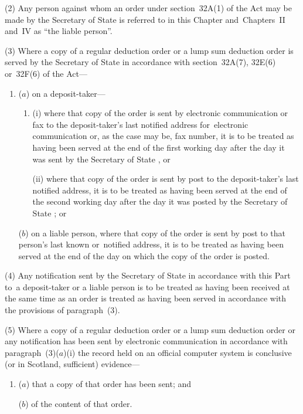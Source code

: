 \documentclass[12pt,a4paper]{article}
\begin{document}
(2) Any person against whom an order under section~32A(1) of the Act may be made by the  %
Secretary of State  %
is referred to in this Chapter and~Chapters~II and~IV as “the liable person”.

(3) Where a copy of a regular deduction order or a lump sum deduction order is served by the  
Secretary of State  %
in accordance with section~32A(7), 32E(6) or~32F(6) of the Act—
\begin{enumerate}\item[]
($a$) on a deposit-taker—
\begin{enumerate}\item[]
(i) where that copy of the order is sent by electronic communication or fax to the deposit-taker’s last notified address for~electronic communication or, as the case may be, fax number, it is to be treated as having been served at the end of the first working day after the day it was sent by the 
Secretary of State%
, or

(ii) where that copy of the order is sent by post to the deposit-taker’s last notified address, it is to be treated as having been served at the end of the second working day after the day it was posted by the 
Secretary of State%
; or
\end{enumerate}

($b$) on a liable person, where that copy of the order is sent by post to that person’s last known or~notified address, it is to be treated as having been served at the end of the day on which the copy of the order is posted.
\end{enumerate}

(4) Any notification sent by the 
Secretary of State  %
in accordance with this Part to~a deposit-taker or a liable person is to be treated as having been received at the same time as an order is treated as having been served in accordance with the provisions of paragraph~(3).

(5) Where a copy of a regular deduction order or a lump sum deduction order or any notification has been sent by electronic communication in accordance with paragraph~(3)($a$)(i)  the record held on an official computer system is conclusive (or in Scotland, sufficient) evidence—
\begin{enumerate}\item[]
($a$) that a copy of that order has been sent; and

($b$) of the content of that order.
\end{enumerate}
\end{document}

